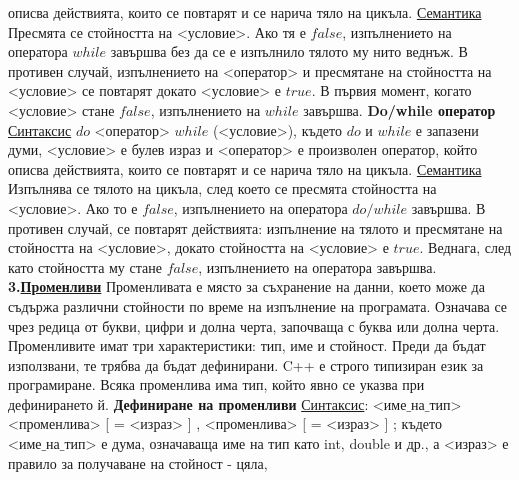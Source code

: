 \documentclass{article}
\begin{document}
описва действията, които се повтарят и се нарича тяло на цикъла. \newline
\underline{Семантика} \newline
Пресмята се стойността на <условие>. Ако тя е $false$, изпълнението на оператора $while$ завършва без да се е изпълнило тялото му
нито веднъж. В противен случай, изпълнението на <оператор> и пресмятане на стойността на <условие> се повтарят докато <условие>
е $true$. В първия момент, когато <условие> стане $false$, изпълнението на $while$ завършва. \newline\newline
\textbf{Do/while оператор} \newline
\underline{Синтаксис} \newline
$do$ <оператор> \newline $while$ (<условие>), където $do$ и $while$ е запазени думи, <условие> е булев израз и <оператор> е
произволен оператор, който описва действията, които се повтарят и се нарича тяло на цикъла. \newline
\underline{Семантика} \newline
Изпълнява се тялото на цикъла, след което се пресмята стойността на <условие>. Ако то е $false$, изпълнението на оператора
$do/while$ завършва. В противен случай, се повтарят действията: изпълнение на тялото и пресмятане на стойността на <условие>,
докато стойността на <условие> е $true$. Веднага, след като стойността му стане $false$, изпълнението на оператора завършва. \newline\newline
\textbf{3.\underline{Променливи}} \newline\newline
Променливата е място за съхранение на данни, което може да съдържа различни стойности по време на изпълнение на програмата.
Означава се чрез редица от букви, цифри и долна черта, започваща с буква или долна черта. Променливите имат три характеристики:
тип, име и стойност. Преди да бъдат използвани, те трябва да бъдат дефинирани. C++ е строго типизиран език за програмиране.
Всяка променлива има тип, който явно се указва при дефинирането й. \newline\newline
\textbf{Дефиниране на променливи} \newline\newline
\underline{Синтаксис}:
$\text{<име\_на\_тип>}$ <променлива> [ = <израз> ] {, <променлива> [ = <израз> ] };
където $\text{<име\_на\_тип>}$ е дума, означаваща име на тип като int, double и др., а <израз> е правило за получаване на стойност - цяла,
\end{document}
